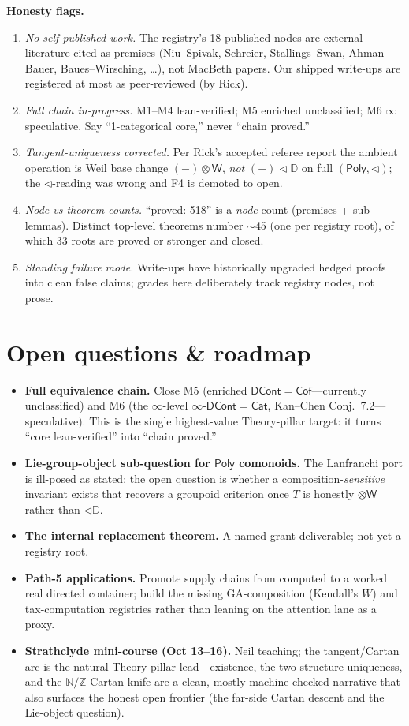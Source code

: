 \documentclass[11pt]{article}
\theoremstyle{definition}
\newcommand{\Poly}{\mathsf{Poly}}
\newcommand{\DCont}{\mathsf{DCont}}
\newcommand{\Cof}{\mathsf{Cof}}
\newcommand{\Cat}{\mathsf{Cat}}
\newcommand{\N}{\mathbb{N}}
\newcommand{\Z}{\mathbb{Z}}
\newcommand{\DD}{\mathbb{D}}
\newcommand{\W}{\mathsf{W}}
\begin{document}
\noindent\textbf{Honesty flags.}
\begin{enumerate}
\item \emph{No self-published work.} The registry's 18 \textsf{published} nodes are external
literature cited as premises (Niu--Spivak, Schreier, Stallings--Swan, Ahman--Bauer,
Baues--Wirsching, \dots), not MacBeth papers. Our shipped write-ups are registered at most as
\textsf{peer-reviewed} (by Rick).
\item \emph{Full chain in-progress.} M1--M4 lean-verified; M5 enriched unclassified; M6 $\infty$
speculative. Say ``1-categorical core,'' never ``chain proved.''
\item \emph{Tangent-uniqueness corrected.} Per Rick's accepted referee report the ambient operation
is Weil base change $(-)\otimes\W$, \emph{not} $(-)\lhd\DD$ on full $(\Poly,\lhd)$; the
$\lhd$-reading was wrong and F4 is demoted to open.
\item \emph{Node vs theorem counts.} ``\textsf{proved}: 518'' is a \emph{node} count
(premises + sub-lemmas). Distinct top-level theorems number $\sim$45 (one per registry root), of
which 33 roots are \textsf{proved} or stronger and closed.
\item \emph{Standing failure mode.} Write-ups have historically upgraded hedged proofs into clean
false claims; grades here deliberately track registry nodes, not prose.
\end{enumerate}

\section{Open questions \& roadmap}

\begin{itemize}
\item \textbf{Full equivalence chain.} Close M5 (enriched $\DCont = \Cof$---currently
unclassified) and M6 (the $\infty$-level $\infty\text{-}\DCont = \Cat$, Kan--Chen Conj.\ 7.2---
speculative). This is the single highest-value Theory-pillar target: it turns ``core lean-verified''
into ``chain proved.''
\item \textbf{Lie-group-object sub-question for $\Poly$ comonoids.} The Lanfranchi port is ill-posed
as stated; the open question is whether a composition-\emph{sensitive} invariant exists that
recovers a groupoid criterion once $T$ is honestly $\otimes\W$ rather than $\lhd\DD$.
\item \textbf{The internal replacement theorem.} A named grant deliverable; not yet a registry root.
\item \textbf{Path-5 applications.} Promote supply chains from \textsf{computed} to a worked real
directed container; build the missing GA-composition (Kendall's $W$) and tax-computation registries
rather than leaning on the attention lane as a proxy.
\item \textbf{Strathclyde mini-course (Oct 13--16).} Neil teaching; the tangent/Cartan arc is the
natural Theory-pillar lead---existence, the two-structure uniqueness, and the $\N/\Z$ Cartan knife
are a clean, mostly machine-checked narrative that also surfaces the honest open frontier (the
far-side Cartan descent and the Lie-object question).
\end{itemize}
\end{document}
